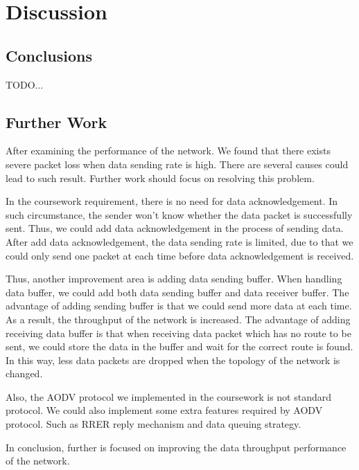\chapter{Discussion}
\label{chap:discussion}


\section{Conclusions}
TODO...

\section{Further Work}


After examining the performance of the network. We found that there exists severe packet loss when data sending rate is high. There are several causes could lead to such result. Further work should focus on resolving this problem.

In the coursework requirement, there is no need for data acknowledgement. In such circumstance, the sender won’t know whether the data packet is successfully sent. Thus, we could add data acknowledgement in the process of sending data. After add data acknowledgement, the data sending rate is limited, due to that we could only send one packet at each time before data acknowledgement is received.

Thus, another improvement area is adding data sending buffer. When handling data buffer, we could add both data sending buffer and data receiver buffer. The advantage of adding sending buffer is that we could send more data at each time. As a result, the throughput of the network is increased. The advantage of adding receiving data buffer is that when receiving data packet which has no route to be sent, we could store the data in the buffer and wait for the correct route is found. In this way, less data packets are dropped when the topology of the network is changed.

Also, the AODV protocol we implemented in the coursework is not standard protocol. We could also implement some extra features required by AODV protocol. Such as RRER reply mechanism and data queuing strategy.

In conclusion, further is focused on improving the data throughput performance of the network.






